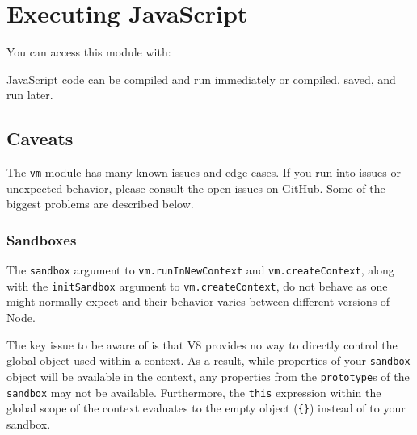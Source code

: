 \section{Executing JavaScript}

\begin{Shaded}
\begin{Highlighting}[]
\NormalTok{: } \NormalTok{- }
\end{Highlighting}
\end{Shaded}

You can access this module with:

\begin{Shaded}
\begin{Highlighting}[]
 \NormalTok{);}
\end{Highlighting}
\end{Shaded}

JavaScript code can be compiled and run immediately or compiled, saved,
and run later.

\subsection{Caveats}

The \texttt{vm} module has many known issues and edge cases. If you run
into issues or unexpected behavior, please consult
\href{https://github.com/joyent/node/issues/search?q=vm}{the open issues
on GitHub}. Some of the biggest problems are described below.

\subsubsection{Sandboxes}

The \texttt{sandbox} argument to \texttt{vm.runInNewContext} and
\texttt{vm.createContext}, along with the \texttt{initSandbox} argument
to \texttt{vm.createContext}, do not behave as one might normally expect
and their behavior varies between different versions of Node.

The key issue to be aware of is that V8 provides no way to directly
control the global object used within a context. As a result, while
properties of your \texttt{sandbox} object will be available in the
context, any properties from the \texttt{prototype}s of the
\texttt{sandbox} may not be available. Furthermore, the \texttt{this}
expression within the global scope of the context evaluates to the empty
object (\texttt{\{\}}) instead of to your sandbox.

